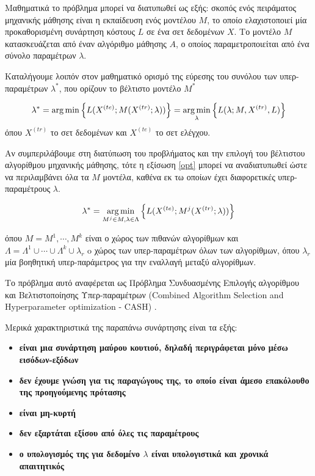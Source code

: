  	Μαθηματικά το πρόβλημα μπορεί να διατυπωθεί ως εξής: σκοπός ενός πειράματος μηχανικής μάθησης είναι η εκπαίδευση ενός μοντέλου $M$, το οποίο ελαχιστοποιεί μία προκαθορισμένη συνάρτηση κόστους $L$ σε ένα σετ δεδομένων $X$. Το μοντέλο $Μ$ κατασκευάζεται από έναν αλγόριθμο μάθησης $Α$, ο οποίος παραμετροποιείται από ένα σύνολο παραμέτρων $\lambda$.
 	
 	Καταλήγουμε λοιπόν στον μαθηματικό ορισμό της εύρεσης του συνόλου των υπερ-παραμέτρων $\lambda^*$, που ορίζουν το βέλτιστο μοντέλο $M^*$
 	
 	
 	\begin{equation}
 	\label{opt}
 	\lambda^* = \operatorname*{arg\,min} \left \{L(X^{(te)}; M(X^{(tr)}; \lambda)) \right \} = \operatorname*{arg\,min}_{\lambda} \left \{L(\lambda; M, X^{(tr)}, L) \right \}
 	\end{equation} 
 	όπου $X^{(tr)}$ το σετ δεδομένων και $X^{(te)}$ το σετ ελέγχου.
 	
 	Αν συμπεριλάβουμε στη διατύπωση του προβλήματος και την επιλογή του βέλτιστου αλγορίθμου μηχανικής μάθησης, τότε η εξίσωση \ref{opt} μπορεί να αναδιατυπωθεί ώστε να περιλαμβάνει όλα τα $M$ μοντέλα, καθένα εκ τω οποίων έχει διαφορετικές υπερ-παραμέτρους $\lambda$. 
 	
 	\begin{equation}
 	\label{optCash}
 	\lambda^* = \operatorname*{arg\,min}_{M^{j} \in M, \lambda \in \Lambda} \left \{L(X^{(te)}; M^{j}(X^{(tr)}; \lambda)) \right \}
 	\end{equation} 
 	
 	όπου $M ={M^{1}, \cdots, M^{k}}$ είναι ο χώρος των πιθανών αλγορίθμων και $ \Lambda = \Lambda^{1} \cup \cdots \cup \Lambda^{k} \cup {\lambda_r} $ o χώρος των υπερ-παραμέτρων όλων των αλγορίθμων, όπου $\lambda_r$ μία βοηθητική υπερ-παράμετρος για την εναλλαγή μεταξύ αλγορίθμων.
 	
 	Το πρόβλημα αυτό αναφέρεται ως Πρόβλημα Συνδυασμένης Επιλογής αλγορίθμου και Βελτιστοποίησης Υπερ-παραμέτρων (Combined Algorithm Selection and Hyperparameter optimiza\-tion - CASH) \citep{DBLP:journals/corr/LoshchilovH16}.
 	
	Μερικά χαρακτηριστικά της παραπάνω συνάρτησης είναι τα εξής:
	\begin{itemize}
		\item \textbf{είναι μια συνάρτηση μαύρου κουτιού, δηλαδή περιγράφεται μόνο μέσω εισόδων-εξόδων}
		\item \textbf{δεν έχουμε γνώση για τις παραγώγους της, το οποίο είναι άμεσο επακόλουθο της προηγούμενης πρότασης}
		\item \textbf{είναι μη-κυρτή} 
		\item \textbf{δεν εξαρτάται εξίσου από όλες τις παραμέτρους} 
		\item \textbf{ο υπολογισμός της για δεδομένο $\lambda$ είναι υπολογιστικά και χρονικά απαιτητικός}
	\end{itemize}
	
